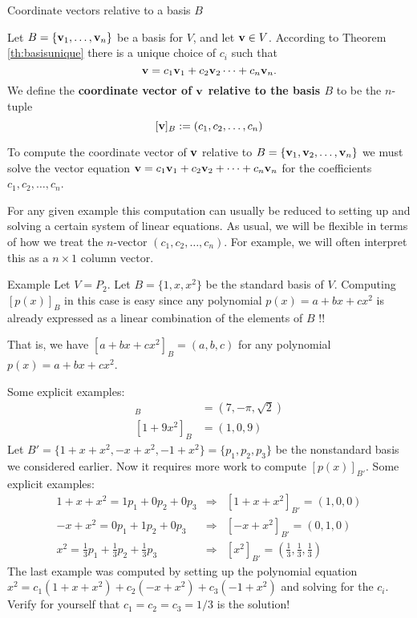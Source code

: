 \begin{frame}{Coordinate vectors relative to a basis $B$}
\begin{definition}
Let $B=\{{\mathbf v}_1,\dots ,{\mathbf v}_n\}$ be a basis for $V$, and let ${\mathbf v}\in V$. According to Theorem \ref{th:basisunique} there is a unique choice of $c_i$ such that 
\[
{\mathbf v}=c_1{\mathbf v}_1+c_2{\mathbf v}_2\cdots +c_n{\mathbf v}_n.
\]
We define the {\bf coordinate vector of ${\mathbf v}$ relative to the basis $B$} to be the $n$-tuple 
\[
[{\mathbf v}]_B:=(c_1,c_2,\dots, c_n)
\]
\end{definition}
\pause
\begin{comments}
\bb
\ii To compute the coordinate vector of ${\mathbf v}$ relative to $B=\{{\mathbf v}_1,{\mathbf v}_2,\dots, {\mathbf v}_n\}$ we must \alert{solve} the vector equation ${\mathbf v}=c_1{\mathbf v}_1+c_2{\mathbf v}_2+\cdots +c_n{\mathbf v}_n$ for the coefficients $c_1, c_2,\dots, c_n$. 

For any given example this computation can usually be reduced to setting up and solving a certain system of linear equations. 
\pause
\ii As usual, we will be flexible in terms of how we treat the $n$-vector $(c_1,c_2,\dots, c_n)$. For example, we will often interpret this as a $n\times 1$ column vector.  
\ee
\end{comments} 
\end{frame}
\begin{frame}{Example} 
Let $V=P_2$. 
\bb
\ii Let $B=\{1,x, x^2\}$ be the standard basis of $V$. Computing $[p(x)]_B$ in this case is easy since any polynomial $p(x)=a+bx+cx^2$ is already expressed as a linear combination of the elements of $B$ !! 

That is, we have $[a+bx+cx^2]_B=(a,b,c)$ for any polynomial $p(x)=a+bx+cx^2$. 

\pause Some explicit examples:
\begin{align*}
 [7-\pi x+\sqrt{2}x^2]_B&= (7, -\pi, \sqrt{2})\\
 [1+9x^2]_B&=(1,0,9)
\end{align*}
\pause
\ii Let $B'=\{1+x+x^2, -x+x^2, -1+x^2\}=\{p_1,p_2,p_3\}$ be the nonstandard basis we considered earlier. Now it requires more work to compute $[p(x)]_{B'}$. 
\pause Some explicit examples:
\begin{eqnarray*}
1+x+x^2=1p_1+0p_2+0p_3&\Rightarrow&[1+x+x^2]_{B'}=(1,0,0)\\
-x+x^2=0p_1+1p_2+0p_3&\Rightarrow&[-x+x^2]_{B'}=(0,1,0)\\
x^2=\frac{1}{3}p_1+\frac{1}{3}p_2+\frac{1}{3}p_3&\Rightarrow& [x^2]_{B'}=(\frac{1}{3},\frac{1}{3},\frac{1}{3})
\end{eqnarray*}
\ee
\pause The last example was computed by setting up the polynomial equation $x^2=c_1(1+x+x^2)+c_2(-x+x^2)+c_3(-1+x^2)$ and solving for the $c_i$. Verify for yourself that $c_1=c_2=c_3=1/3$ is the solution!

\end{frame}

